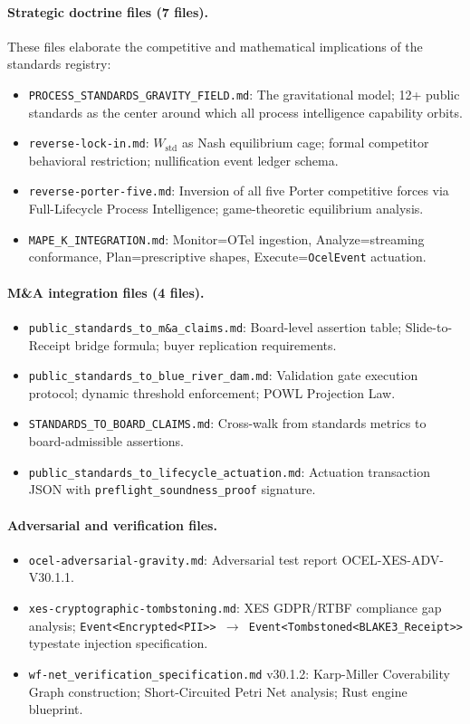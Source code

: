 \paragraph{Strategic doctrine files (7 files).}
These files elaborate the competitive and mathematical implications of the standards
registry:
\begin{itemize}
  \item \texttt{PROCESS\_STANDARDS\_GRAVITY\_FIELD.md}: The gravitational model; 12+
        public standards as the center around which all process intelligence capability
        orbits.
  \item \texttt{reverse-lock-in.md}: $W_{\text{std}}$ as Nash equilibrium cage; formal
        competitor behavioral restriction; nullification event ledger schema.
  \item \texttt{reverse-porter-five.md}: Inversion of all five Porter competitive forces
        via Full-Lifecycle Process Intelligence; game-theoretic equilibrium analysis.
  \item \texttt{MAPE\_K\_INTEGRATION.md}: Monitor=OTel ingestion, Analyze=streaming
        conformance, Plan=prescriptive shapes, Execute=\texttt{OcelEvent} actuation.
\end{itemize}

\paragraph{M\&A integration files (4 files).}
\begin{itemize}
  \item \texttt{public\_standards\_to\_m\&a\_claims.md}: Board-level assertion table;
        Slide-to-Receipt bridge formula; buyer replication requirements.
  \item \texttt{public\_standards\_to\_blue\_river\_dam.md}: Validation gate execution
        protocol; dynamic threshold enforcement; POWL Projection Law.
  \item \texttt{STANDARDS\_TO\_BOARD\_CLAIMS.md}: Cross-walk from standards metrics
        to board-admissible assertions.
  \item \texttt{public\_standards\_to\_lifecycle\_actuation.md}: Actuation transaction
        JSON with \texttt{preflight\_soundness\_proof} signature.
\end{itemize}

\paragraph{Adversarial and verification files.}
\begin{itemize}
  \item \texttt{ocel-adversarial-gravity.md}: Adversarial test report OCEL-XES-ADV-V30.1.1.
  \item \texttt{xes-cryptographic-tombstoning.md}: XES GDPR/RTBF compliance gap analysis;
        \texttt{Event<Encrypted<PII>> $\to$ Event<Tombstoned<BLAKE3\_Receipt>>} typestate
        injection specification.
  \item \texttt{wf-net\_verification\_specification.md} v30.1.2: Karp-Miller Coverability
        Graph construction; Short-Circuited Petri Net analysis; Rust engine blueprint.
\end{itemize}

